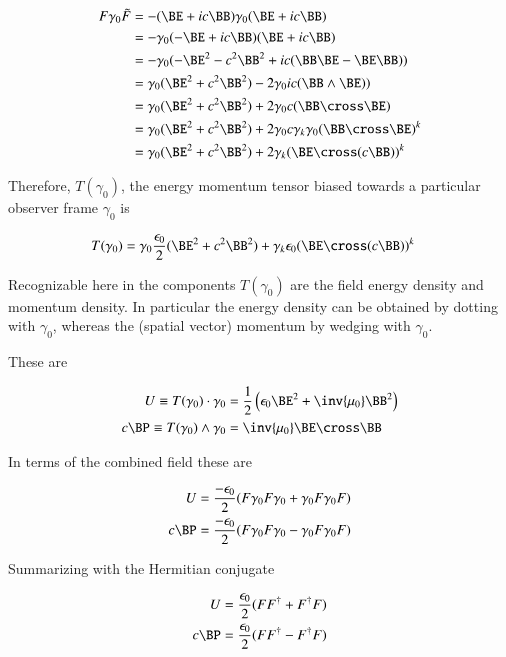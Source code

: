 \begin{align*}
F \gamma_0 \tilde{F}
&=
-(\BE + i c \BB) \gamma_0 (\BE + i c \BB) \\
&=
-\gamma_0 (-\BE + i c \BB) (\BE + i c \BB) \\
&=
-\gamma_0 (-\BE^2 - c^2 \BB^2 + i c (\BB \BE - \BE \BB) ) \\
&=
\gamma_0 (\BE^2 + c^2 \BB^2) - 2 \gamma_0 i c (\BB \wedge \BE) ) \\
&=
\gamma_0 (\BE^2 + c^2 \BB^2) + 2 \gamma_0 c (\BB \cross \BE) \\
&=
\gamma_0 (\BE^2 + c^2 \BB^2) + 2 \gamma_0 c \gamma_k \gamma_0 (\BB \cross \BE)^k \\
&=
\gamma_0 (\BE^2 + c^2 \BB^2) + 2 \gamma_k (\BE \cross (c \BB))^k \\
\end{align*}

Therefore, $T(\gamma_0)$, the energy momentum tensor biased towards a particular observer frame $\gamma_0$
is

\begin{align}\label{eqn:emFourVect}
T(\gamma_0)
&=
\gamma_0 \frac{\epsilon_0}{2} (\BE^2 + c^2 \BB^2) + \gamma_k \epsilon_0 (\BE \cross (c \BB))^k
\end{align}

Recognizable here in the components $T(\gamma_0)$ are the field energy density and momentum density.  In particular the energy density can be obtained by dotting with $\gamma_0$, whereas the (spatial vector) momentum by wedging with $\gamma_0$.

These are

\begin{align}
U \equiv T(\gamma_0) \cdot \gamma_0 &= \frac{1}{2} \left( \epsilon_0 \BE^2 + \inv{\mu_0} \BB^2 \right) \\
c \BP \equiv T(\gamma_0) \wedge \gamma_0 &= \inv{\mu_0} \BE \cross \BB
\end{align}

In terms of the combined field these are

\begin{align}
U &= \frac{-\epsilon_0}{2}( F \gamma_0 F \gamma_0 + \gamma_0 F \gamma_0 F) \\
c \BP &= \frac{-\epsilon_0}{2}( F \gamma_0 F \gamma_0 - \gamma_0 F \gamma_0 F)
\end{align}

Summarizing with the Hermitian conjugate

\begin{align}
U &= \frac{\epsilon_0}{2}( F F^\dagger + F^\dagger F) \\
c \BP &= \frac{\epsilon_0}{2}( F F^\dagger - F^\dagger F)
\end{align}

